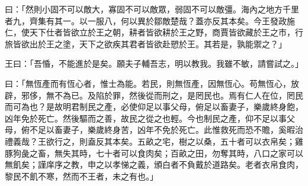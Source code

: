 \documentclass[12pt,a4paper]{ctexbook}
\begin{document}
曰：「然則小固不可以敵大，寡固不可以敵眾，弱固不可以敵彊。海內之地方千里者九，齊集有其一。以一服八，何以異於鄒敵楚哉？蓋亦反其本矣。今王發政施仁，使天下仕者皆欲立於王之朝，耕者皆欲耕於王之野，商賈皆欲藏於王之市，行旅皆欲出於王之塗，天下之欲疾其君者皆欲赴愬於王。其若是，孰能禦之？」\par
王曰：「吾惛，不能進於是矣。願夫子輔吾志，明以教我。我雖不敏，請嘗試之。」\par
曰：「無恆產而有恆心者，惟士為能。若民，則無恆產，因無恆心。苟無恆心，放辟，邪侈，無不為已。及陷於罪，然後從而刑之，是罔民也。焉有仁人在位，罔民而可為也？是故明君制民之產，必使仰足以事父母，俯足以畜妻子，樂歲終身飽，凶年免於死亡。然後驅而之善，故民之從之也輕。今也制民之產，仰不足以事父母，俯不足以畜妻子，樂歲終身苦，凶年不免於死亡。此惟救死而恐不贍，奚暇治禮義哉？王欲行之，則盍反其本矣。五畝之宅，樹之以桑，五十者可以衣帛矣；雞豚狗彘之畜，無失其時，七十者可以食肉矣；百畝之田，勿奪其時，八口之家可以無飢矣；謹庠序之教，申之以孝悌之義，頒白者不負戴於道路矣。老者衣帛食肉，黎民不飢不寒，然而不王者，未之有也。」\par
\end{document}
